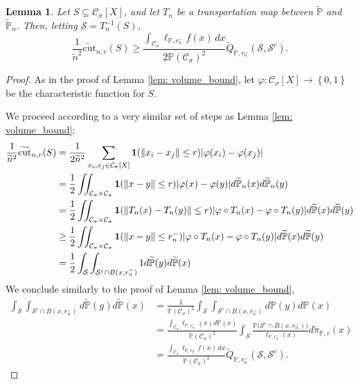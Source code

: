 \documentclass{article}
\DeclarePairedDelimiter\abs{\lvert}{\rvert}
\newcommand{\set}[1]{\left\{#1\right\}}
\newcommand{\cut}{\mathrm{cut}}
\newcommand{\norm}[1]{\left\lVert#1\right\rVert}
\newcommand{\1}{\mathbf{1}}
\newcommand{\Xbf}{X}             %
\newcommand{\Pbb}{\mathbb{P}}
\newcommand{\Sset}{\mathcal{S}}
\newcommand{\Cset}{\mathcal{C}}
\newcommand{\Csig}{\Cset_{\sigma}}
\newcommand{\dx}{\,dx}
\newcommand{\piwt}{\widetilde{\pi}}
\theoremstyle{aldenthm}
\newtheorem{lemma}{Lemma}
\theoremstyle{aldenrmrk}
\begin{document}
\begin{lemma}
	\label{lem: cut_bound}
	Let $S \subseteq \Csig[\Xbf]$, and let $T_n$ be a transportation map between $\widetilde{\Pbb}$ and $\widetilde{\Pbb}_n$. Then, letting $\Sset = T_n^{-1}(S)$,
	\begin{equation*}
	\frac{1}{\widetilde{n}^2} \widetilde{\cut}_{n,r}(S) \geq \frac{\int_{\Csig} \ell_{\Pbb,r_n^-}f(x) \dx}{2 \Pbb(\Csig)^2} \widetilde{Q}_{\Pbb,r_n^-}(\Sset, \Sset^c).
	\end{equation*}
\end{lemma}
\begin{proof}
	As in the proof of Lemma \ref{lem: volume_bound}, let $\varphi: \Csig[\Xbf] \to \set{0,1}$ be the characteristic function for $S$.
	
	We proceed according to a very similar set of steps as Lemma \ref{lem: volume_bound}:
	\begin{align*}
	\frac{1}{\widetilde{n}^2} \widetilde{\cut}_{n,r}(S) & = \frac{1}{2 \widetilde{n}^2} \sum_{x_i, x_j \in \Csig[\Xbf]} \1(\norm{x_i - x_j} \leq r) \abs{\varphi(x_i) - \varphi(x_j)} \\
	& = \frac{1}{2}\iint_{\Csig \times \Csig} \1(\norm{x - y} \leq r) \abs{\varphi(x) - \varphi(y)} d\widetilde{\Pbb}_n(x) d\widetilde{\Pbb}_n(y) \\
	& =  \frac{1}{2}\iint_{\Csig \times \Csig} \1(\norm{T_n(x) - T_n(y)} \leq r) \abs{\varphi \circ T_n(x) - \varphi \circ T_n(y)} d\widetilde{\Pbb}(x) d\widetilde{\Pbb}(y) \\
	& \geq \frac{1}{2} \iint_{\Csig \times \Csig} \1(\norm{x - y} \leq r_n^-) \abs{\varphi \circ T_n(x) - \varphi \circ T_n(y)} d\widetilde{\Pbb}(x) d\widetilde{\Pbb}(y) \\
	& = \frac{1}{2} \int_{\Sset} \int_{\Sset^c \cap B(x,r_n^-)} 1 d\widetilde{\Pbb}(y) d\widetilde{\Pbb}(x)
	\end{align*}
	We conclude similarly to the proof of Lemma \ref{lem: volume_bound},
	\begin{align*}
	\int_{\Sset} \int_{\Sset^c \cap B(x,r_n^-)} d\widetilde{\Pbb}(y) d\widetilde{\Pbb}(x) & = \frac{1}{\Pbb(\Csig)^2} \int_{\Sset} \int_{\Sset^c \cap B(x,r_n^-)} d\Pbb(y) d\Pbb(x) \\
	& = \frac{\int_{\Csig} \ell_{\Pbb,r_n^-}(x) d\Pbb(x)}{\Pbb(\Csig)^2} \int_{\Sset} \frac{\Pbb\bigl(\Sset^c \cap B(x,r_n^-)\bigr)}{\ell_{\Pbb,r_n^-}(x)} d\piwt_{\Pbb,r}(x) \\
	& = \frac{\int_{\Csig} \ell_{\Pbb,r_n^-}f(x) \dx}{\Pbb(\Csig)^2} \widetilde{Q}_{\Pbb,r_n^-}(\Sset, \Sset^c).
	\end{align*}	
\end{proof}
\end{document}
